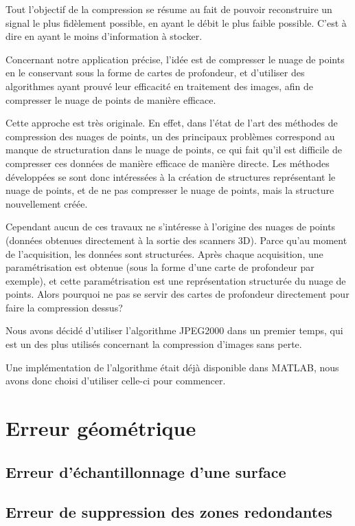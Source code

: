 \documentclass{report}
\begin{document}
Tout l'objectif de la compression se résume au fait de pouvoir reconstruire un signal le plus fidèlement possible, en ayant le débit le plus faible possible. C'est à dire en ayant le moins d'information à stocker.

Concernant notre application précise, l'idée est de compresser le nuage de points en le conservant sous la forme de cartes de profondeur, et d'utiliser des algorithmes ayant prouvé leur efficacité en traitement des images, afin de compresser le nuage de points de manière efficace.

Cette approche est très originale. En effet, dans l'état de l'art des méthodes de compression des nuages de points, un des principaux problèmes correspond au manque de structuration dans le nuage de points, ce qui fait qu'il est difficile de compresser ces données de manière efficace de manière directe.
Les méthodes développées se sont donc intéressées à la création de structures représentant le nuage de points, et de ne pas compresser le nuage de points, mais la structure nouvellement créée.

Cependant aucun de ces travaux ne s'intéresse à l'origine des nuages de points (données obtenues directement à la sortie des scanners 3D). Parce qu'au moment de l'acquisition, les données sont structurées.
Après chaque acquisition, une paramétrisation est obtenue (sous la forme d'une carte de profondeur par exemple), et cette paramétrisation est une représentation structurée du nuage de points. Alors pourquoi ne pas se servir des cartes de profondeur directement pour faire la compression dessus?

Nous avons décidé d'utiliser l'algorithme JPEG2000 dans un premier temps, qui est un des plus utilisés concernant la compression d'images sans perte.

Une implémentation de l'algorithme était déjà disponible dans MATLAB, nous avons donc choisi d'utiliser celle-ci pour commencer.

\section{Erreur géométrique} %

\subsection{Erreur d'échantillonnage d'une surface} %

\subsection{Erreur de suppression des zones redondantes}
\end{document}
